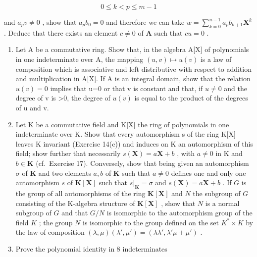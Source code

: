 \[
0 \leqslant k <   p \leqslant m - 1
\]

and \(a_{p}v \neq 0\) , show that \(a_{p}b_{0} = 0\) and therefore we can take \(w = \sum_{k=0}^{n-1} a_{p}b_{k+1}\mathbf{X}^{k}\) . Deduce that there exists an element \(c \neq 0\) of \(\mathbf{A}\) such that \(cu = 0\) .

\begin{enumerate}
\def\labelenumi{\arabic{enumi}.}
\setcounter{enumi}{16}
\item
  Let A be a commutative ring. Show that, in the algebra A{[}X{]} of polynomials in one indeterminate over A, the mapping \((u,v)\mapsto u(v)\) is a law of composition which is associative and left distributive with respect to addition and multiplication in A{[}X{]}. If A is an integral domain, show that the relation \(u(v)=0\) implies that u=0 or that v is constant and that, if \(u\neq0\) and the degree of v is \textgreater0, the degree of \(u(v)\) is equal to the product of the degrees of u and v.
\item
  Let K be a commutative field and K{[}X{]} the ring of polynomials in one indeterminate over K. Show that every automorphism s of the ring K{[}X{]} leaves K invariant (Exercise 14(c)) and induces on K an automorphism of this field; show further that necessarily \(s(\mathbf{X}) = a\mathbf{X} + b\) , with \(a \neq 0\) in K and \(b \in \mathbf{K}\) (cf.~Exercise 17). Conversely, show that being given an automorphism \(\sigma\) of \(\mathbf{K}\) and two elements \(a, b\) of \(\mathbf{K}\) such that \(a \neq 0\) defines one and only one automorphism \(s\) of \(\mathbf{K}[\mathbf{X}]\) such that \(s|_{\mathbf{K}} = \sigma\) and \(s(\mathbf{X}) = a\mathbf{X} + b\) . If \(G\) is the group of all automorphisms of the ring \(\mathbf{K}[\mathbf{X}]\) and \(N\) the subgroup of \(G\) consisting of the K-algebra structure of \(\mathbf{K}[\mathbf{X}]\) , show that \(N\) is a normal subgroup of \(G\) and that \(G / N\) is isomorphic to the automorphism group of the field \(K\) ; the group \(N\) is isomorphic to the group defined on the set \(K^* \times K\) by the law of composition \((\lambda, \mu)(\lambda', \mu') = (\lambda\lambda', \lambda' \mu + \mu')\) .
\item
  Prove the polynomial identity in 8 indeterminates
\end{enumerate}

